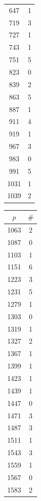 \documentclass{article}
\theoremstyle{definition}
\begin{document}
\begin{table}[htbp]
\begin{minipage}{0.135\textwidth}
\begin{tabular}{c|c}
        647 & 1 \\
        719 & 3 \\
        727 & 1 \\
        743 & 1 \\
        751 & 5 \\
        823 & 0 \\
        839 & 2 \\
        863 & 5 \\
        887 & 1 \\
        911 & 4 \\
        919 & 1 \\
        967 & 3 \\
        983 & 0 \\
        991 & 5 \\
        1031 & 1 \\
        1039 & 2
    \end{tabular}
\end{minipage}\hspace{-2mm}
%
\begin{minipage}{0.135\textwidth}
    \centering
    \begin{tabular}{c|c}
        $p$ & $\#$ \\ \hline
        1063 & 2 \\
        1087 & 0 \\
        1103 & 1 \\
        1151 & 6 \\
        1223 & 3 \\
        1231 & 5 \\
        1279 & 1 \\
        1303 & 0 \\
        1319 & 1 \\
        1327 & 2 \\
        1367 & 1 \\
        1399 & 1 \\
        1423 & 1 \\
        1439 & 1 \\
        1447 & 0 \\
        1471 & 3 \\
        1487 & 3 \\
        1511 & 1 \\
        1543 & 3 \\
        1559 & 1 \\
        1567 & 0 \\
        1583 & 2 \\

\end{tabular}
\end{minipage}
\end{table}
\end{document}

